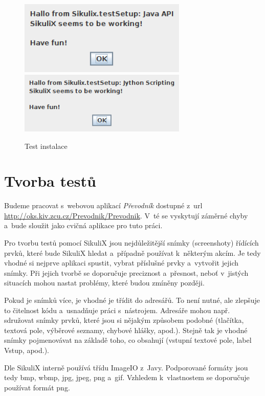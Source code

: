 	\begin{figure}[ht!]
		\centering
		\caption{Test instalace}
		\label{InstalOK}
		\includegraphics[width=8cm]{img/Instalace/InstalaceOK.png}\\[0.3cm]
		\includegraphics[width=8cm]{img/Instalace/InstalaceOK1.png}
	\end{figure}
	
	\section{Tvorba testů}
	Budeme pracovat s~webovou aplikací \emph{Převodník} dostupné z~url \url{http://oks.kiv.zcu.cz/Prevodnik/Prevodnik}. V~té se vyskytují záměrné chyby a~bude sloužit jako cvičná aplikace pro tuto práci.
	
	Pro tvorbu testů pomocí SikuliX jsou nejdůležitější snímky (screenshoty) řídících prvků, které bude SikuliX hledat a~případně používat k~některým akcím. Je tedy vhodné si nejprve aplikaci spustit, vybrat příslušné prvky a~vytvořit jejich snímky. Při jejich tvorbě se doporučuje preciznost a~přesnost, neboť v~jistých situacích mohou nastat problémy, které budou zmíněny později.
	
	Pokud je snímků více, je vhodné je třídit do adresářů. To není nutné, ale zlepšuje to čitelnost kódu a~usnadňuje práci s~nástrojem. Adresáře mohou např. sdružovat snímky prvků, které jsou si nějakým způsobem podobné (tlačítka, textová pole, výběrové seznamy, chybové hlášky, apod.). Stejně tak je vhodné snímky pojmenovávat na základě toho, co obsahují (vstupní textové pole, label Vstup, apod.).
	
	Dle \citep{SikuliXImgs} SikuliX interně používá třídu ImageIO z~Javy. Podporované formáty jsou tedy bmp, wbmp, jpg, jpeg, png a~gif. Vzhledem k~vlastnostem se doporučuje používat formát png.
	
